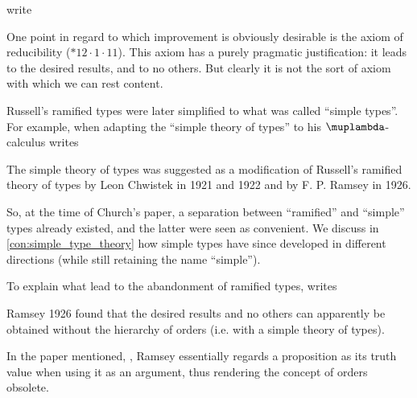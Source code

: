 \begin{remark}\label{rem:unramified_theory_of_types}
  \Textcite[xix]{WhiteheadRussell1927PrincipiaMathematicaVol1} write
  \begin{displayquote}
    One point in regard to which improvement is obviously desirable is the axiom of reducibility (\( {\ast} 12 {\cdot} 1 {\cdot} 11 \)). This axiom has a purely pragmatic justification: it leads to the desired results, and to no others. But clearly it is not the sort of axiom with which we can rest content.
  \end{displayquote}

  Russell's ramified types were later simplified to what was called \enquote{simple types}. For example, when adapting the \enquote{simple theory of types} to his \( \muplambda \)-calculus \textcite{Church1940STT} writes
  \begin{displayquote}
    The simple theory of types was suggested as a modification of Russell's ramified theory of types by Leon Chwistek in 1921 and 1922 and by F. P. Ramsey in 1926.
  \end{displayquote}

  So, at the time of Church's paper, a separation between \enquote{ramified} and \enquote{simple} types already existed, and the latter were seen as convenient. We discuss in \cref{con:simple_type_theory} how simple types have since developed in different directions (while still retaining the name \enquote{simple}).

  To explain what lead to the abandonment of ramified types, \textcite[45]{Kleene1971Metamathematics} writes
  \begin{displayquote}
    Ramsey 1926 found that the desired results and no others can apparently be obtained without the hierarchy of orders (i.e. with a simple theory of types).
  \end{displayquote}

  In the paper mentioned, \cite{Ramsey1926Foundations}, Ramsey essentially regards a proposition as its truth value when using it as an argument, thus rendering the concept of orders obsolete.
\end{remark}

